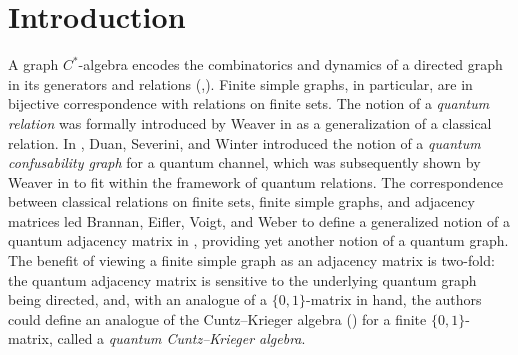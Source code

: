 \documentclass[11pt]{article}
\theoremstyle{plain}
\theoremstyle{nonumberplain}
\theoremstyle{plain}
\theoremstyle{nonumberplain}
\newcommand\1{{\bf 1}}
\newcommand{\<}{\left\langle}
\renewcommand{\>}{\right\rangle}
\begin{document}




\section{Introduction}

A graph $C^*$-algebra encodes the combinatorics and dynamics of a directed graph in its generators and relations (\cite{Kumjian04},\cite{BatesPaskRaeburnSzymanski2000}). %
Finite simple graphs, in particular, are in bijective correspondence with relations on finite sets. The notion of a {\em quantum relation} was formally introduced by Weaver in \cite{Weaver10} as a generalization of a classical relation. In \cite{DuanSeveriniWinter13}, Duan, Severini, and Winter introduced the notion of a {\em quantum confusability graph} for a quantum channel, which was subsequently shown by Weaver in \cite{Weaver21} to fit within the framework of quantum relations. The correspondence between classical relations on finite sets, finite simple graphs, and adjacency matrices led Brannan, Eifler, Voigt, and Weber to define a generalized notion of a quantum adjacency matrix in \cite{BEVW22}, providing yet another notion of a quantum graph. The benefit of viewing a finite simple graph as an adjacency matrix is two-fold: the quantum adjacency matrix is sensitive to the underlying quantum graph being directed, and, with an analogue of a $\{0,1\}$-matrix in hand, the authors could define an analogue of the Cuntz--Krieger algebra (\cite{CK80}) for a finite $\{0,1\}$-matrix, called a {\em quantum Cuntz--Krieger algebra}.
\end{document}
